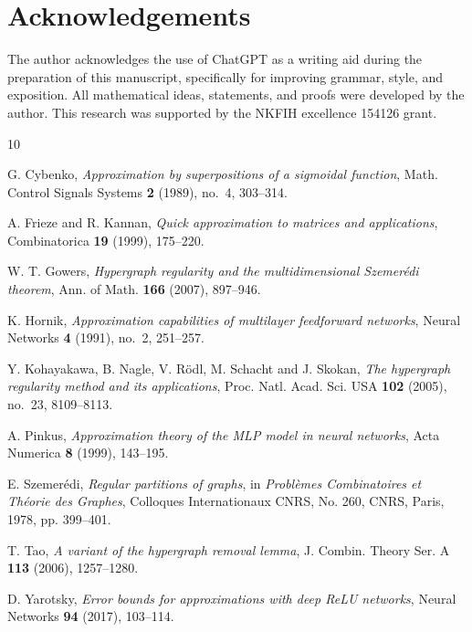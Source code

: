 \documentclass[11pt]{amsart}
\newcommand{\1}{\mathbf 1}
\begin{document}
\section*{Acknowledgements}
The author acknowledges the use of ChatGPT as a writing aid during the preparation of this manuscript, specifically for improving grammar, style, and exposition. All mathematical ideas, statements, and proofs were developed by the author. 
This research was supported by the NKFIH excellence 154126 grant.

\begin{thebibliography}{10}

G. Cybenko,
\textit{Approximation by superpositions of a sigmoidal function},
Math. Control Signals Systems \textbf{2} (1989), no.~4, 303--314.

A. Frieze and R. Kannan,
\textit{Quick approximation to matrices and applications},
Combinatorica \textbf{19} (1999), 175--220.

W. T. Gowers,
\textit{Hypergraph regularity and the multidimensional Szemer\'edi theorem},
Ann. of Math. \textbf{166} (2007), 897--946.

K. Hornik,
\textit{Approximation capabilities of multilayer feedforward networks},
Neural Networks \textbf{4} (1991), no.~2, 251--257.

Y. Kohayakawa, B. Nagle, V. R\"odl, M. Schacht and J. Skokan,
\textit{The hypergraph regularity method and its applications},
Proc. Natl. Acad. Sci. USA \textbf{102} (2005), no.~23, 8109--8113.

A. Pinkus,
\textit{Approximation theory of the MLP model in neural networks},
Acta Numerica \textbf{8} (1999), 143--195.


E. Szemer\'edi,
\textit{Regular partitions of graphs},
in \textit{Probl\`emes Combinatoires et Th\'eorie des Graphes},
Colloques Internationaux CNRS, No. 260, CNRS, Paris, 1978, pp. 399--401.

T. Tao,
\textit{A variant of the hypergraph removal lemma},
J. Combin. Theory Ser. A \textbf{113} (2006), 1257--1280.







D. Yarotsky,
\textit{Error bounds for approximations with deep ReLU networks},
Neural Networks \textbf{94} (2017), 103--114.

\end{thebibliography}
\end{document}
